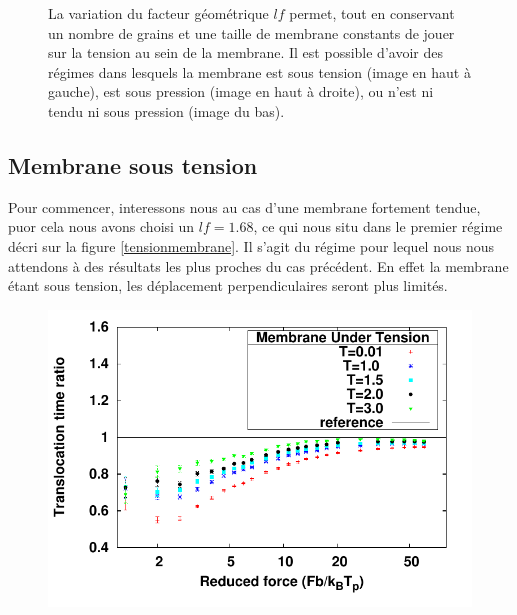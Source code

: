 \begin{figure}[H]
\begin{center}
\begin{minipage}{0.5\linewidth}
\end{minipage}
\begin{minipage}{0.49\linewidth}
\caption[Tension au sein de la membrane]{La variation du facteur géométrique $lf$ permet, tout en conservant un nombre de grains et une taille de membrane constants de jouer sur la tension au sein de la membrane. Il est possible d'avoir des régimes dans lesquels la membrane est sous tension (image en haut à gauche), est sous pression (image en haut à droite), ou n'est ni tendu ni sous pression (image du bas).}
\label{snapshottensionmembranesnapshot}
\end{minipage}

\end{center}
\end{figure}



\newpage

\subsection{Membrane sous tension}

Pour commencer, interessons nous au cas d'une membrane fortement tendue, puor cela nous avons choisi un $lf=1.68$, ce qui nous situ dans le premier régime décri sur la figure \ref{tensionmembrane}. Il s'agit du régime pour lequel nous nous attendons à des résultats les plus proches du cas précédent. En effet la membrane étant sous tension, les déplacement perpendiculaires seront plus limités.



\begin{figure}[H]
\begin{center}
\includegraphics[width=1\textwidth]{hightension.pdf} 
\label{membranetendueevoltemp}
\end{center}
\end{figure}




